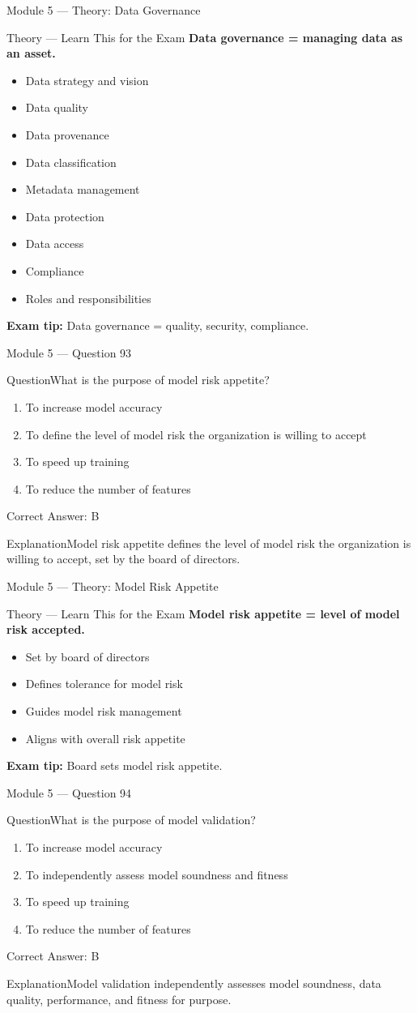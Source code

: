 \documentclass[aspectratio=169,10pt]{beamer}
\newcommand{\question}[1]{\begin{block}{Question}#1\end{block}}
\newcommand{\options}[4]{%
	\begin{enumerate}[label=\Alph*.,leftmargin=*]
		\item #1
		\item #2
		\item #3
		\item #4
	\end{enumerate}
}
\newcommand{\answerbox}[1]{\begin{exampleblock}{Correct Answer: #1}\end{exampleblock}}
\newcommand{\explain}[1]{\begin{block}{Explanation}#1\end{block}}
\newcommand{\theory}[1]{%
	\begin{block}{Theory --- Learn This for the Exam}
		\small #1
	\end{block}
}
\begin{document}
	\begin{frame}{Module 5 --- Theory: Data Governance}
		\theory{
			\textbf{Data governance = managing data as an asset.}
			\begin{itemize}
				\item Data strategy and vision
				\item Data quality
				\item Data provenance
				\item Data classification
				\item Metadata management
				\item Data protection
				\item Data access
				\item Compliance
				\item Roles and responsibilities
			\end{itemize}
			\textbf{Exam tip:} Data governance = quality, security, compliance.
		}
	\end{frame}
	
	\begin{frame}{Module 5 --- Question 93}
		\question{What is the purpose of model risk appetite?}
		\options{To increase model accuracy}{To define the level of model risk the organization is willing to accept}{To speed up training}{To reduce the number of features}
		\answerbox{B}
		\explain{Model risk appetite defines the level of model risk the organization is willing to accept, set by the board of directors.}
	\end{frame}
	
	\begin{frame}{Module 5 --- Theory: Model Risk Appetite}
		\theory{
			\textbf{Model risk appetite = level of model risk accepted.}
			\begin{itemize}
				\item Set by board of directors
				\item Defines tolerance for model risk
				\item Guides model risk management
				\item Aligns with overall risk appetite
			\end{itemize}
			\textbf{Exam tip:} Board sets model risk appetite.
		}
	\end{frame}
	
	\begin{frame}{Module 5 --- Question 94}
		\question{What is the purpose of model validation?}
		\options{To increase model accuracy}{To independently assess model soundness and fitness}{To speed up training}{To reduce the number of features}
		\answerbox{B}
		\explain{Model validation independently assesses model soundness, data quality, performance, and fitness for purpose.}
	\end{frame}
	
\end{document}
